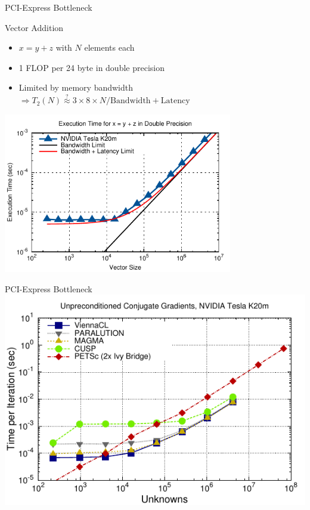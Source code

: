 \begin{frame}{PCI-Express Bottleneck}

 \begin{block}{Vector Addition}
  \begin{itemize}
   \item $x = y + z$ with $N$ elements each
   \item 1 FLOP per 24 byte in double precision
   \item Limited by memory bandwidth $\Rightarrow T_2(N) \stackrel{?}{\approx} 3 \times 8 \times N / \mathrm{Bandwidth} + \mathrm{Latency}$
  \end{itemize}
 \end{block}

 \vspace*{-0.5cm}
 \begin{center}
  \includegraphics[width=0.75\textwidth]{figures/vector-addition-time-3}
 \end{center}
 
 \end{frame}



\begin{frame}{PCI-Express Bottleneck}
  \includegraphics[width=1.0\textwidth]{figures/time-laplace2d-K20m-cg}
\end{frame}

